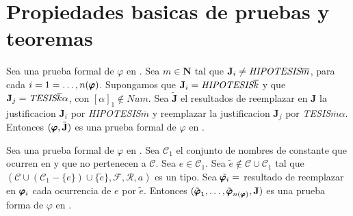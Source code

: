 
\section{Propiedades basicas de pruebas y teoremas}

\begin{lemma}
  Sea \padec una prueba formal de $\varphi$ en \forder. Sea $m\in\mathbf{N}$ tal que 
  $\mathbf{J}_i\neq\emph{HIPOTESIS}\overline{m}$, para cada $i=1=\dots,n(\pmb{\varphi})$. Supongamos
  que $\mathbf{J}_i=\emph{HIPOTESIS}\overline{k}$ y que $\mathbf{J}_j=\emph{TESIS}\overline{k}\alpha$,
  con $[\alpha]_1\not\in Num$. Sea $\tilde{\mathbf{J}}$ el resultados de reemplazar en $\mathbf{J}$
  la justificacion $\mathbf{J}_i$ por \emph{HIPOTESIS}$\overline{m}$ y reemplazar la justificacion $\mathbf{J}_j$
  por \emph{TESIS}$\overline{m}\alpha$. Entonces $(\pmb{\varphi},\tilde{\mathbf{J}})$ es una prueba formal de 
  $\varphi$ en \forder.
\end{lemma}
\noproof

\begin{lemma}
  Sea \padec una prueba formal de $\varphi$ en \forder. Sea $\mathcal{C}_1$ el conjunto de nombres de constante 
  que ocurren en \pvarphi y que no pertenecen a $\mathcal{C}$. Sea $e\in \mathcal{C}_1$. Sea $\tilde{e}\not\in\mathcal{C}\cup\mathcal{C}_1$
  tal que $(\mathcal{C}\cup(\mathcal{C}_1-\{e\})\cup\{\tilde{e}\},\mathcal{F},\mathcal{R},a)$ es un tipo.
  Sea $\tilde{\pmb{\varphi}_i}=$ resultado de reemplazar en $\pmb{\varphi}_i$ cada ocurrencia de $e$ por $\tilde{e}$.
  Entonces $(\tilde{\pmb{\varphi}}_{1}, \dots, \tilde{\pmb{\varphi}}_{n(\pmb{\varphi})},\mathbf{J})$ es una prueba forma de $\varphi$ en \forder.
\end{lemma}
\noproof

